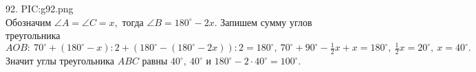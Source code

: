 92. {{PIC:g92.png}}\\
Обозначим $\angle A=\angle C=x,$ тогда $\angle B=180^\circ-2x.$ Запишем сумму углов треугольника $AOB:\ 70^\circ+(180^\circ-x):2+(180^\circ-(180^\circ-2x)):2=180^\circ,\ 70^\circ +90^\circ-\frac{1}{2}x+x=180^\circ,\ \frac{1}{2}x=20^\circ,\ x=40^\circ.$ Значит углы треугольника $ABC$ равны $40^\circ,\ 40^\circ$ и $180^\circ-2\cdot40^\circ=100^\circ.$\newpage\noindent
